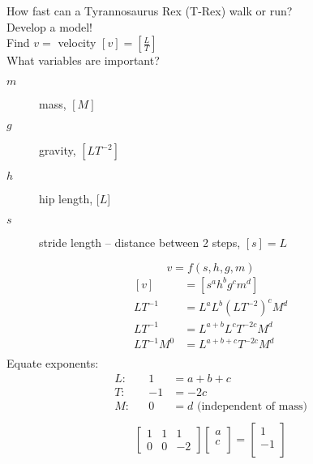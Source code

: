 \documentclass[
	date={August 26{,} 2024}
]{math486notes}
\begin{document}
\begin{example}
	How fast can a Tyrannosaurus Rex (T-Rex) walk or run?\\
	Develop a model!\\
	Find $v=$ velocity $[v] = \left[ \frac{L}{T} \right]$\\
	What variables are important?
	\begin{description}
		\item[$m$] mass, $[M]$
		\item[$g$] gravity, $[LT^{-2}]$
		\item[$h$] hip length, [$L$]
		\item[$s$] stride length -- distance between 2 steps, $[s]=L$
	\end{description}
	\[ v = f(s, h, g, m) \]
	\begin{equation*}
	\begin{aligned}
		[v] &= [s^{a}h^{b}g^{c}m^{d}]\\
		LT^{-1} &= L^{a}L^{b}\left( LT^{-2} \right)^{c}M^{d}\\
		LT^{-1} &= L^{a+b}L^{c}T^{-2c}M^{d}\\
		LT^{-1}M^{0} &= L^{a+b+c}T^{-2c}M^{d}\\
	\end{aligned}
	\end{equation*}
	Equate exponents:
	\begin{equation*}
	\begin{aligned}
		L:&& 1 &= a + b + c\\
		T{:}&& -1 &= -2c\\
		M:&& 0 &= d \mbox{ (independent of mass)}\\
	\end{aligned}
	\end{equation*}
	\begin{equation*}
	\begin{aligned}
		\left[ \begin{array}{rrr}
			1 & 1 & 1\\
			0 & 0 & -2
		\end{array} \right]\left[ \begin{array}{c}
			a\\
			c\\
		\end{array} \right] = \left[ \begin{array}{r}
			1\\
			-1\\
		\end{array} \right]
	\end{aligned}

\end{equation*}
\end{example}
\end{document}
